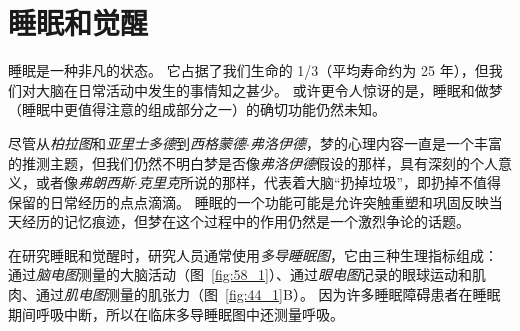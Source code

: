 \chapter{睡眠和觉醒} \label{chap:chap44}

睡眠是一种非凡的状态。
它占据了我们生命的 1/3（平均寿命约为 25 年），但我们对大脑在日常活动中发生的事情知之甚少。
或许更令人惊讶的是，睡眠和做梦（睡眠中更值得注意的组成部分之一）的确切功能仍然未知。


尽管从\textit{柏拉图}和\textit{亚里士多德}到\textit{西格蒙德$\cdot$弗洛伊德}，梦的心理内容一直是一个丰富的推测主题，但我们仍然不明白梦是否像\textit{弗洛伊德}假设的那样，具有深刻的个人意义，或者像\textit{弗朗西斯$\cdot$克里克}所说的那样，代表着大脑“扔掉垃圾”，即扔掉不值得保留的日常经历的点点滴滴。
睡眠的一个功能可能是允许突触重塑和巩固反映当天经历的记忆痕迹，但梦在这个过程中的作用仍然是一个激烈争论的话题。


在研究睡眠和觉醒时，研究人员通常使用\textit{多导睡眠图}，它由三种生理指标组成：
通过\textit{脑电图}测量的大脑活动（图~\ref{fig:58_1}）、通过\textit{眼电图}记录的眼球运动和肌肉、通过\textit{肌电图}测量的肌张力（图~\ref{fig:44_1}B）。
因为许多睡眠障碍患者在睡眠期间呼吸中断，所以在临床多导睡眠图中还测量呼吸。


